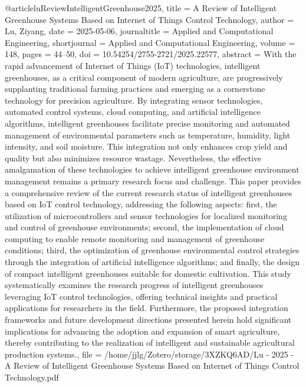 {{{{@article{luReviewIntelligentGreenhouse2025,
  title = {A {{Review}} of {{Intelligent Greenhouse Systems Based}} on {{Internet}} of {{Things Control Technology}}},
  author = {Lu, Ziyang},
  date = {2025-05-06},
  journaltitle = {Applied and Computational Engineering},
  shortjournal = {Applied and Computational Engineering},
  volume = {148},
  pages = {44--50},
  doi = {10.54254/2755-2721/2025.22577},
  abstract = {With the rapid advancement of Internet of Things (IoT) technologies, intelligent greenhouses, as a critical component of modern agriculture, are progressively supplanting traditional farming practices and emerging as a cornerstone technology for precision agriculture. By integrating sensor technologies, automated control systems, cloud computing, and artificial intelligence algorithms, intelligent greenhouses facilitate precise monitoring and automated management of environmental parameters such as temperature, humidity, light intensity, and soil moisture. This integration not only enhances crop yield and quality but also minimizes resource wastage. Nevertheless, the effective amalgamation of these technologies to achieve intelligent greenhouse environment management remains a primary research focus and challenge. This paper provides a comprehensive review of the current research status of intelligent greenhouses based on IoT control technology, addressing the following aspects: first, the utilization of microcontrollers and sensor technologies for localized monitoring and control of greenhouse environments; second, the implementation of cloud computing to enable remote monitoring and management of greenhouse conditions; third, the optimization of greenhouse environmental control strategies through the integration of artificial intelligence algorithms; and finally, the design of compact intelligent greenhouses suitable for domestic cultivation. This study systematically examines the research progress of intelligent greenhouses leveraging IoT control technologies, offering technical insights and practical applications for researchers in the field. Furthermore, the proposed integration frameworks and future development directions presented herein hold significant implications for advancing the adoption and expansion of smart agriculture, thereby contributing to the realization of intelligent and sustainable agricultural production systems.},
  file = {/home/jjlg/Zotero/storage/3XZKQ6AD/Lu - 2025 - A Review of Intelligent Greenhouse Systems Based on Internet of Things Control Technology.pdf}
}

}}}}
